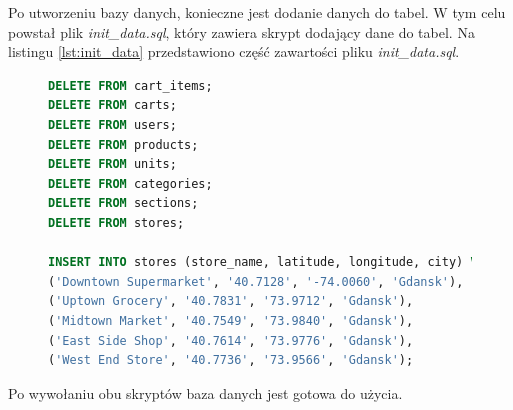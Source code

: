 Po utworzeniu bazy danych, konieczne jest dodanie danych do tabel. W tym celu powstał plik \textit{init\_data.sql}, który zawiera skrypt dodający dane do tabel. Na listingu \ref{lst:init_data} przedstawiono część zawartości pliku \textit{init\_data.sql}.

\begin{figure}[H]
\begin{lstlisting}[language=SQL, caption=Fragment pliku init\_data.sql, label=lst:init_data]
DELETE FROM cart_items;
DELETE FROM carts;
DELETE FROM users;
DELETE FROM products;
DELETE FROM units;
DELETE FROM categories;
DELETE FROM sections;
DELETE FROM stores;

INSERT INTO stores (store_name, latitude, longitude, city) VALUES
('Downtown Supermarket', '40.7128', '-74.0060', 'Gdansk'),
('Uptown Grocery', '40.7831', '73.9712', 'Gdansk'),
('Midtown Market', '40.7549', '73.9840', 'Gdansk'),
('East Side Shop', '40.7614', '73.9776', 'Gdansk'),
('West End Store', '40.7736', '73.9566', 'Gdansk');

\end{lstlisting}
\end{figure}
Po wywołaniu obu skryptów baza danych jest gotowa do użycia.